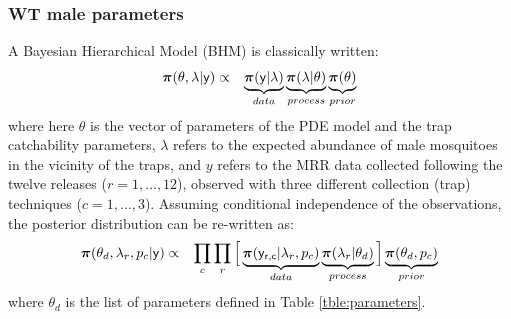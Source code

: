 \documentclass[]{bmcart}
\begin{document}
\subsubsection{WT male parameters}
A Bayesian Hierarchical Model (BHM) is classically written:
  \begin{eqnarray}
{\bm \pi}(\theta, \lambda | {\sf y}) &\propto & \underbrace{{\bm \pi}({\sf y} | \lambda)}_{data} \underbrace{{\bm \pi}(\lambda | \theta)}_{process} \underbrace{{\bm \pi}( \theta)}_{prior} 
\end{eqnarray}
where here $\theta$ is the vector of parameters of the PDE model and the trap catchability parameters, $\lambda$ refers to the expected abundance of male mosquitoes in the vicinity of the traps, and $y$ refers to the MRR data collected following the twelve releases ($r = {1, \dots, 12}$), observed with three different collection (trap) techniques ($c = {1, \dots, 3}$). Assuming conditional independence of the observations, the posterior distribution can be re-written as:
\begin{eqnarray}
{\bm \pi}(\theta_d, {\lambda_r}, {p_c} | {\sf y}) &\propto & \prod_c \prod_r \Big[  \underbrace{{\bm \pi}({\sf y_{r,c}} | \lambda_r, p_c)}_{data} \underbrace{{\bm \pi}(\lambda_r | \theta_d)}_{process} \Big] \underbrace{{\bm \pi}( \theta_d, p_c)}_{prior} 
\end{eqnarray}
where $\theta_d$ is the list of parameters defined in Table \ref{tble:parameters}.
\end{document}
